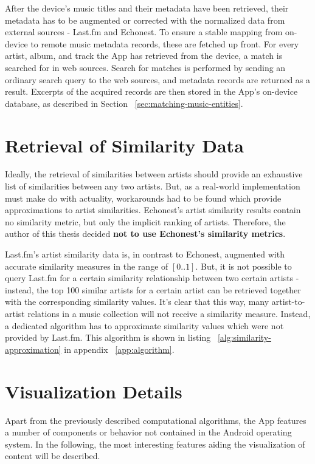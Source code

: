 After the device's music titles and their metadata have been retrieved, their metadata has to be augmented or corrected with the normalized data from external sources - Last.fm and Echonest. To ensure a stable mapping from on-device to remote music metadata records, these are fetched up front. For every artist, album, and track the App has retrieved from the device, a match is searched for in web sources. Search for matches is performed by sending an ordinary search query to the web sources, and metadata records are returned as a result. Excerpts of the acquired records are then stored in the App's on-device database, as described in Section ~\ref{sec:matching-music-entities}.

\section{Retrieval of Similarity Data}

Ideally, the retrieval of similarities between artists should provide an exhaustive list of similarities between any two artists. But, as a real-world implementation must make do with actuality, workarounds had to be found which provide approximations to artist similarities.
Echonest's artist similarity results contain no similarity metric, but only the implicit ranking of artists. Therefore, the author of this thesis decided \textbf{not to use Echonest's similarity metrics}.

Last.fm's artist similarity data is, in contrast to Echonest, augmented with accurate similarity measures in the range of $[0 .. 1]$. But, it is not possible to query Last.fm for a certain similarity relationship between two certain artists - instead, the top 100 similar artists for a certain artist can be retrieved together with the corresponding similarity values. It's clear that this way, many artist-to-artist relations in a music collection will not receive a similarity measure. Instead, a dedicated algorithm has to approximate similarity values which were not provided by Last.fm. This algorithm is shown in listing ~\ref{alg:similarity-approximation} in  appendix ~\ref{app:algorithm}.


\section{Visualization Details}

Apart from the previously described computational algorithms, the App features a number of components or behavior not contained in the Android operating system. In the following, the most interesting features aiding the visualization of content will be described.

